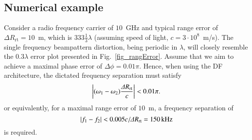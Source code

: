 \subsection{Numerical example}
Consider a radio frequency carrier of $10$~GHz and typical range error of $\Delta{}R_{\text{rt}}=10$~m, which is $333\frac{1}{3}\lambda$ (assuming  speed of light, $c=3\cdot 10^{8}$~m/s). The single frequency beampattern distortion, being periodic in $\lambda$, will closely resemble the $0.3\lambda$ error plot presented in Fig.~\ref{fig_rangError}. Assume that we aim to achieve a maximal phase error of $\Delta \phi=0.01\pi$. Hence, when using the DF architecture, the dictated frequency separation must satisfy
\begin{equation}\label{eq_DF_phErr}
\left\vert(\omega_1-\omega_2)\frac{\Delta{}R_{\text{rt}}}{c}\right\vert<0.01\pi.
\end{equation}
or equivalently, for a maximal range error of $10$~m, a frequency separation of
\[
\left\vert f_1-f_2\right\vert<0.005 c/\Delta{}R_{\text{rt}}=150 \,\text{kHz}
\]
is required. 

